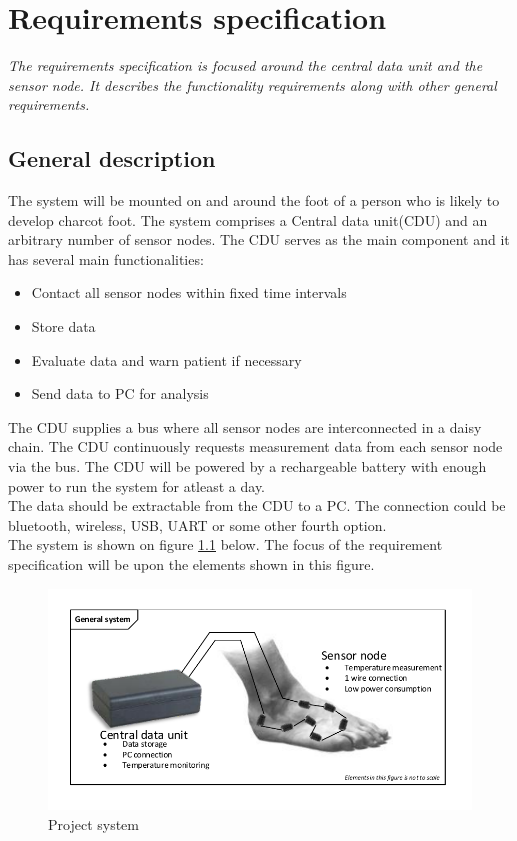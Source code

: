 \chapter{Requirements specification}
\textit{The requirements specification is focused around the central data unit and the sensor node. It describes the functionality requirements along with other general requirements.}
\section{General description}
The system will be mounted on and around the foot of a person who is likely to develop charcot foot. 
The system comprises a Central data unit(CDU) and an arbitrary number of sensor nodes. The CDU serves as the main component and it has several main functionalities:
\begin{itemize}
	\item Contact all sensor nodes within fixed time intervals
	\item Store data
	\item Evaluate data and warn patient if necessary
	\item Send data to PC for analysis
\end{itemize}
The CDU supplies a bus where all sensor nodes are interconnected in a daisy chain.
The CDU continuously requests measurement data from each sensor node via the bus. The CDU will be powered by a rechargeable battery with enough power to run the system for atleast a day.\\
The data should be extractable from the CDU to a PC. The connection could be bluetooth, wireless, USB, UART or some other fourth option.\\
The system is shown on figure \ref{fig:project_system} below. The focus of the requirement specification will be upon the elements shown in this figure.
\begin{figure}[H]
	\centering
	\includegraphics[width=.9\textwidth]{billeder/7requirementspec/GeneralSystem}
	\caption{Project system}
	\label{fig:project_system}
\end{figure}
